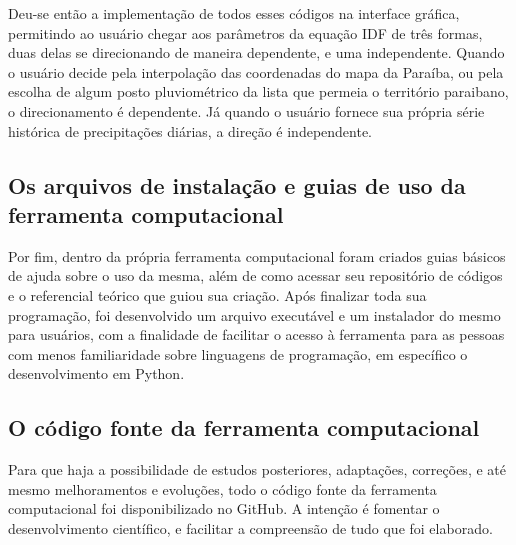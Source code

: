 Deu-se então a implementação de todos esses códigos na interface gráfica, permitindo ao usuário chegar aos parâmetros da equação IDF de três formas, duas delas se direcionando de maneira dependente, e uma independente. Quando o usuário decide pela interpolação das coordenadas do mapa da Paraíba, ou pela escolha de algum posto pluviométrico da lista que permeia o território paraibano, o direcionamento é dependente. Já quando o usuário fornece sua própria série histórica de precipitações diárias, a direção é independente. 

\subsection{Os arquivos de instalação e guias de uso da ferramenta computacional}

Por fim, dentro da própria ferramenta computacional foram criados guias básicos de ajuda sobre o uso da mesma, além de como acessar seu repositório de códigos e o referencial teórico que guiou sua criação. Após finalizar toda sua programação, foi desenvolvido um arquivo executável e um instalador do mesmo para usuários, com a finalidade de facilitar o acesso à ferramenta para as pessoas com menos familiaridade sobre linguagens de programação, em específico o desenvolvimento em Python.

\subsection{O código fonte da ferramenta computacional}

Para que haja a possibilidade de estudos posteriores, adaptações, correções, e até mesmo melhoramentos e evoluções, todo o código fonte da ferramenta computacional foi disponibilizado no GitHub. A intenção é fomentar o desenvolvimento científico, e facilitar a compreensão de tudo que foi elaborado.



	

